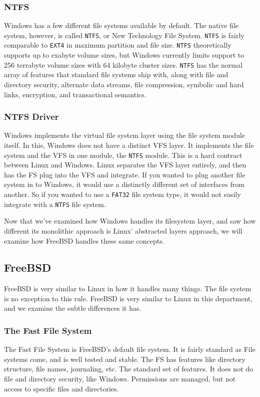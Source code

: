 \documentclass[10pt,letterpaper,onecolumn,draftclsnofoot]{IEEEtran}
\begin{document}
\subsubsection{NTFS}
Windows has a few different file systems available by default. The native file
system, however, is called \texttt{NTFS}, or New Technology File System.
\texttt{NTFS} is fairly comparable to \texttt{EXT4} in maximum partition and
file size. \texttt{NTFS} theoretically supports up to exabyte volume sizes, but
Windows currently limits support to 256 terrabyte volume sizes with 64 kilobyte
cluster sizes. \texttt{NTFS} has the normal array of features that standard file
systems ship with, along with file and directory security, alternate data streams,
file compression, symbolic and hard links, encryption, and transactional semantics.
\cite{internals2}
\subsubsection{NTFS Driver}
Windows implements the virtual file system layer using the file system module itself.
In this, Windows does not have a distinct VFS layer. It implements the file system
and the VFS in one module, the \texttt{NTFS} module. This is a hard contract between
Linux and Windows. Linux separates the VFS layer entirely, and then has the FS plug
into the VFS and integrate. If you wanted to plug another file system in to Windows,
it would use a distinctly different set of interfaces from another. So if you wanted
to use a \texttt{FAT32} file system type, it would not easily integrate with a
\texttt{NTFS} file system. \cite{internals2}

Now that we've examined how Windows handles its filesystem layer, and saw how
different its monolithic approach is Linux' abstracted layers approach, we will
examine how FreeBSD handles these same concepts.

\subsection{FreeBSD}
FreeBSD is very similar to Linux in how it handles many things. The file system
is no exception to this rule. FreeBSD is very similar to Linux in this department,
and we examine the subtle differences it has.
\subsubsection{The Fast File System}
The Fast File System is FreeBSD's default file system. It is fairly standard as
File systems come, and is well tested and stable. The FS has features like directory
structure, file names, journaling, etc. The standard set of features. It does not
do file and directory security, like Windows. Permissions are managed, but not access
to specific files and directories.
\end{document}
